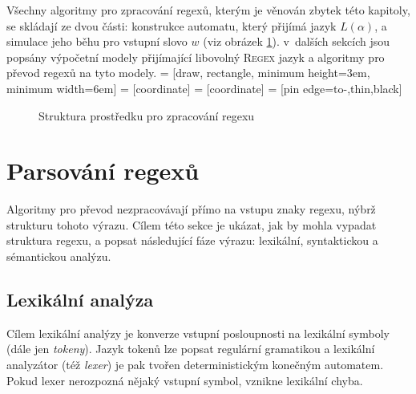 \documentclass[thesis=B,czech]{FITthesis}[2019/12/23]
\theoremstyle{definition}
\begin{document}
Všechny algoritmy pro zpracování regexů, kterým je věnován zbytek této kapitoly, se skládají ze dvou části: konstrukce automatu, který přijímá jazyk $L\left(\alpha\right)$, a simulace jeho běhu pro vstupní slovo $w$ (viz obrázek \ref{fig:engine}). v~dalších sekcích jsou popsány výpočetní modely přijímající libovolný \textsc{Regex} jazyk a algoritmy pro převod regexů na tyto modely.
 = [draw, rectangle, 
    minimum height=3em, minimum width=6em]
 = [coordinate]
 = [coordinate]
 = [pin edge={to-,thin,black}]
\begin{figure}[h]
\centering
{}
\caption{Struktura prostředku pro zpracování regexu}\label{fig:engine}
\end{figure}
\section{Parsování regexů}
Algoritmy pro převod nezpracovávají přímo na vstupu znaky regexu, nýbrž strukturu tohoto výrazu. Cílem této sekce je ukázat, jak by mohla vypadat struktura regexu, a popsat následující fáze  výrazu: lexikální, syntaktickou a sémantickou analýzu.

\subsection{Lexikální analýza}
Cílem lexikální analýzy je konverze vstupní posloupnosti na lexikální symboly (dále jen \emph{tokeny}). Jazyk tokenů lze popsat regulární gramatikou a lexikální analyzátor (též \emph{lexer}) je pak tvořen deterministickým konečným automatem. Pokud lexer nerozpozná nějaký vstupní symbol, vznikne lexikální chyba. 
\end{document}
